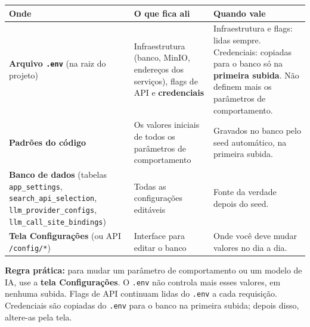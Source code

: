 \documentclass[
  brazilian,
  a4paper,12pt,oneside]{report}
\newcounter{none} %
\begin{document}
{\def\LTcaptype{none} %
\begin{longtable}[]{@{}
  >{\raggedright\arraybackslash}p{}
  >{\raggedright\arraybackslash}p{}
  >{\raggedright\arraybackslash}p{}@{}}
\toprule\noalign{}
\begin{minipage}[b]{\linewidth}\raggedright
Onde
\end{minipage} & \begin{minipage}[b]{\linewidth}\raggedright
O que fica ali
\end{minipage} & \begin{minipage}[b]{\linewidth}\raggedright
Quando vale
\end{minipage} \\
\midrule\noalign{}
\endhead
\bottomrule\noalign{}
\endlastfoot
\textbf{Arquivo \texttt{.}\allowbreak{}\texttt{env}} (na raiz do
projeto) & Infraestrutura (banco, MinIO, endereços dos serviços), flags
de API e \textbf{credenciais} & Infraestrutura e flags: lidas sempre.
Credenciais: copiadas para o banco só na \textbf{primeira subida}. Não
definem mais os parâmetros de comportamento. \\
\textbf{Padrões do código} & Os valores iniciais de todos os parâmetros
de comportamento & Gravados no banco pelo seed automático, na primeira
subida. \\
\textbf{Banco de dados} (tabelas
\texttt{app\_}\allowbreak{}\texttt{settings},
\texttt{search\_}\allowbreak{}\texttt{api\_}\allowbreak{}\texttt{selection},
\texttt{llm\_}\allowbreak{}\texttt{provider\_}\allowbreak{}\texttt{configs},
\texttt{llm\_}\allowbreak{}\texttt{call\_}\allowbreak{}\texttt{site\_}\allowbreak{}\texttt{bindings})
& Todas as configurações editáveis & Fonte da verdade depois do seed. \\
\textbf{Tela Configurações} (ou API
\texttt{/}\allowbreak{}\texttt{config/}\allowbreak{}\texttt{*}) &
Interface para editar o banco & Onde você deve mudar valores no dia a
dia. \\
\end{longtable}
}

\textbf{Regra prática:} para mudar um parâmetro de comportamento ou um
modelo de IA, use a \textbf{tela Configurações}. O
\texttt{.}\allowbreak{}\texttt{env} não controla mais esses valores, em
nenhuma subida. Flags de API continuam lidas do
\texttt{.}\allowbreak{}\texttt{env} a cada requisição. Credenciais são
copiadas do \texttt{.}\allowbreak{}\texttt{env} para o banco na primeira
subida; depois disso, altere-as pela tela.
\end{document}
